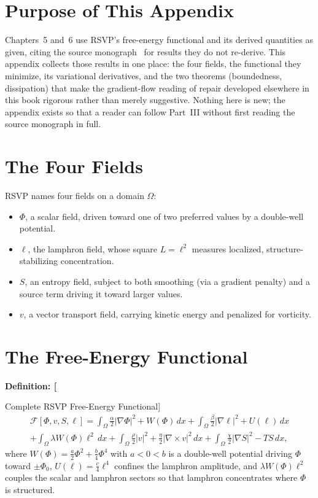 \documentclass[11pt,fleqn]{book}
\numberwithin{equation}{chapter}
\newenvironment{definition}[1]
  {\begin{definitionEnv}
   \noindent\textbf{Definition: #1}\par\smallskip}
  {\end{definitionEnv}}
\theoremstyle{plain}
\theoremstyle{definition}
\theoremstyle{remark}
\begin{document}
\section{Purpose of This Appendix}

Chapters~5 and~6 use RSVP's free-energy functional and its derived quantities as given, citing the source monograph~\cite{holonomic} for results they do not re-derive. This appendix collects those results in one place: the four fields, the functional they minimize, its variational derivatives, and the two theorems (boundedness, dissipation) that make the gradient-flow reading of repair developed elsewhere in this book rigorous rather than merely suggestive. Nothing here is new; the appendix exists so that a reader can follow Part~III without first reading the source monograph in full.

\section{The Four Fields}

RSVP names four fields on a domain \(\Omega\):

\begin{itemize}
\item \(\Phi\), a scalar field, driven toward one of two preferred values by a double-well potential.
\item \(\ell\), the lamphron field, whose square \(L=\ell^2\) measures localized, structure-stabilizing concentration.
\item \(S\), an entropy field, subject to both smoothing (via a gradient penalty) and a source term driving it toward larger values.
\item \(v\), a vector transport field, carrying kinetic energy and penalized for vorticity.
\end{itemize}

\section{The Free-Energy Functional}

\begin{definition}[Complete RSVP Free-Energy Functional]
\begin{multline}
\mathcal F[\Phi,v,S,\ell] = \int_\Omega \frac{\alpha}{2}|\nabla\Phi|^2 + W(\Phi)\,dx + \int_\Omega \frac{\beta}{2}|\nabla\ell|^2 + U(\ell)\,dx \\
+ \int_\Omega \lambda W(\Phi)\ell^2\,dx + \int_\Omega \frac{\rho}{2}|v|^2 + \frac{\eta}{2}|\nabla\times v|^2\,dx + \int_\Omega \frac{\chi}{2}|\nabla S|^2 - TS\,dx,
\end{multline}
where \(W(\Phi)=\tfrac{a}{2}\Phi^2+\tfrac{b}{4}\Phi^4\) with \(a<0<b\) is a double-well potential driving \(\Phi\) toward \(\pm\Phi_0\), \(U(\ell)=\tfrac{c}{4}\ell^4\) confines the lamphron amplitude, and \(\lambda W(\Phi)\ell^2\) couples the scalar and lamphron sectors so that lamphron concentrates where \(\Phi\) is structured.
\end{definition}
\end{document}
